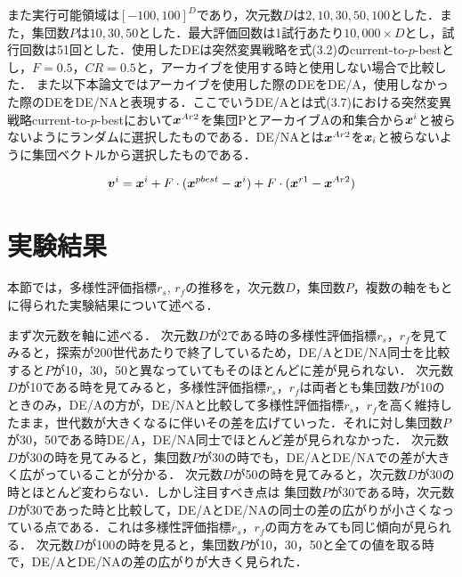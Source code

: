 \documentclass[a4paper,11pt,oneside,openany]{jsbook}
\def\vector#1{\mbox{\boldmath $#1$}}
\begin{document}
また実行可能領域は$[-100, 100]^D$であり，次元数$D$は$2,10,30,50,100$とした．また，集団数$P$は$10,30,50$とした．最大評価回数は1試行あたり$10,000 \times D$とし，試行回数は51回とした．使用したDEは突然変異戦略を式(3.2)のcurrent-to-$p$-bestとし，$F=0.5$，$CR=0.5$と，アーカイブを使用する時と使用しない場合で比較した．
また以下本論文ではアーカイブを使用した際のDEをDE/A，使用しなかった際のDEをDE/NAと表現する．ここでいうDE/Aとは式(3.7)における突然変異戦略current-to-$p$-bestにおいて$\vector{x}^{Ar2}$を集団PとアーカイブAの和集合から${\vector{x}^i}$と被らないようにランダムに選択したものである．DE/NAとは$\vector{x}^{Ar2}$を$\vector{x}_{i}$と被らないように集団ベクトルから選択したものである．

\begin{eqnarray}
\vector{v}^{i} = \vector{x}^{i} + F\cdot(\vector{x}^{pbest} - \vector{x}^{i}) + F\cdot(\vector{x}^{r1} - \vector{x}^{Ar2})
\end{eqnarray}




\section{実験結果}
本節では，多様性評価指標$r_s$, $r_f$の推移を，次元数$D$，集団数$P$，複数の軸をもとに得られた実験結果について述べる．

まず次元数を軸に述べる．
次元数$D$が2である時の多様性評価指標$r_s$，$r_f$を見てみると，探索が200世代あたりで終了しているため，DE/AとDE/NA同士を比較すると$P$が10，30，50と異なっていてもそのほとんどに差が見られない．
次元数$D$が10である時を見てみると，多様性評価指標$r_s$，$r_f$は両者とも集団数$P$が10のときのみ，DE/Aの方が，DE/NAと比較して多様性評価指標$r_s$，$r_f$を高く維持したまま，世代数が大きくなるに伴いその差を広げていった．それに対し集団数$P$が30，50である時DE/A，DE/NA同士でほとんど差が見られなかった．
次元数$D$が30の時を見てみると，集団数$P$が30の時でも，DE/AとDE/NAでの差が大きく広がっていることが分かる．
次元数$D$が50の時を見てみると，次元数$D$が30の時とほとんど変わらない．しかし注目すべき点は
集団数$P$が30である時，次元数$D$が30であった時と比較して，DE/AとDE/NAの同士の差の広がりが小さくなっている点である．これは多様性評価指標$r_s$，$r_f$の両方をみても同じ傾向が見られる．
次元数$D$が100の時を見ると，集団数$P$が10，30，50と全ての値を取る時で，DE/AとDE/NAの差の広がりが大きく見られた．
\end{document}
